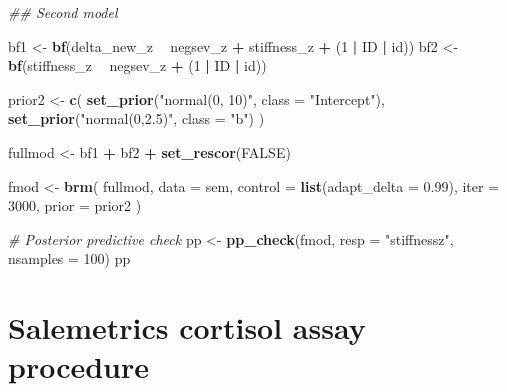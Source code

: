 \documentclass[
  english,
  man,floatsintext]{apa6}
\newenvironment{Shaded}{\begin{snugshade}}{\end{snugshade}}
\newcommand{\CommentTok}[1]{\textcolor[rgb]{0.56,0.35,0.01}{\textit{#1}}}
\newcommand{\DataTypeTok}[1]{\textcolor[rgb]{0.13,0.29,0.53}{#1}}
\newcommand{\DecValTok}[1]{\textcolor[rgb]{0.00,0.00,0.81}{#1}}
\newcommand{\FloatTok}[1]{\textcolor[rgb]{0.00,0.00,0.81}{#1}}
\newcommand{\KeywordTok}[1]{\textcolor[rgb]{0.13,0.29,0.53}{\textbf{#1}}}
\newcommand{\NormalTok}[1]{#1}
\newcommand{\OperatorTok}[1]{\textcolor[rgb]{0.81,0.36,0.00}{\textbf{#1}}}
\newcommand{\OtherTok}[1]{\textcolor[rgb]{0.56,0.35,0.01}{#1}}
\newcommand{\StringTok}[1]{\textcolor[rgb]{0.31,0.60,0.02}{#1}}
\begin{document}
\begin{Shaded}
\begin{Highlighting}[]
\CommentTok{## Second model}

\NormalTok{bf1 <-}\StringTok{ }\KeywordTok{bf}\NormalTok{(delta_new_z }\OperatorTok{~}\StringTok{ }\NormalTok{negsev_z }\OperatorTok{+}\StringTok{ }\NormalTok{stiffness_z }\OperatorTok{+}\StringTok{ }\NormalTok{(}\DecValTok{1} \OperatorTok{|}\StringTok{ }\NormalTok{ID }\OperatorTok{|}\StringTok{ }\NormalTok{id))}
\NormalTok{bf2 <-}\StringTok{ }\KeywordTok{bf}\NormalTok{(stiffness_z }\OperatorTok{~}\StringTok{ }\NormalTok{negsev_z }\OperatorTok{+}\StringTok{ }\NormalTok{(}\DecValTok{1} \OperatorTok{|}\StringTok{ }\NormalTok{ID }\OperatorTok{|}\StringTok{ }\NormalTok{id))}

\NormalTok{prior2 <-}\StringTok{ }\KeywordTok{c}\NormalTok{(}
  \KeywordTok{set_prior}\NormalTok{(}\StringTok{"normal(0, 10)"}\NormalTok{, }\DataTypeTok{class =} \StringTok{"Intercept"}\NormalTok{),}
  \KeywordTok{set_prior}\NormalTok{(}\StringTok{"normal(0,2.5)"}\NormalTok{, }\DataTypeTok{class =} \StringTok{"b"}\NormalTok{)}
\NormalTok{)}

\NormalTok{fullmod <-}\StringTok{ }\NormalTok{bf1 }\OperatorTok{+}\StringTok{ }\NormalTok{bf2 }\OperatorTok{+}\StringTok{ }\KeywordTok{set_rescor}\NormalTok{(}\OtherTok{FALSE}\NormalTok{)}

\NormalTok{fmod <-}\StringTok{ }\KeywordTok{brm}\NormalTok{(}
\NormalTok{  fullmod,}
  \DataTypeTok{data =}\NormalTok{ sem,}
  \DataTypeTok{control =} \KeywordTok{list}\NormalTok{(}\DataTypeTok{adapt_delta =} \FloatTok{0.99}\NormalTok{),}
  \DataTypeTok{iter =} \DecValTok{3000}\NormalTok{,}
  \DataTypeTok{prior =}\NormalTok{ prior2}
\NormalTok{)}

\CommentTok{# Posterior predictive check}
\NormalTok{pp <-}\StringTok{ }\KeywordTok{pp_check}\NormalTok{(fmod, }\DataTypeTok{resp =} \StringTok{"stiffnessz"}\NormalTok{, }\DataTypeTok{nsamples =} \DecValTok{100}\NormalTok{)}
\NormalTok{pp}
\end{Highlighting}
\end{Shaded}

\hypertarget{salemetrics-cortisol-assay-procedure}{%
\section{Salemetrics cortisol assay procedure}\label{salemetrics-cortisol-assay-procedure}}



\end{document}
